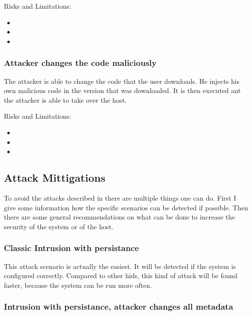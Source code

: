 \documentclass[
	a4paper,					%
	10pt,							%
	twoside,					%
	openright,				%
	notitlepage,			%
	parskip=half,			%
]{scrreprt}					%
\begin{document}
Risks and Limitations:
\begin{itemize}
	\item {}
	\item {}
	\item {}
\end{itemize}

\subsubsection{Attacker changes the code maliciously}
\label{sec:attack:codechange}

The attacker is able to change the code that the user downloads. He injects his own malicious code in the version that was downloaded. It is then executed ant the attacker is able to take over the host.

Risks and Limitations:
\begin{itemize}
	\item {}
	\item {}
	\item {}
\end{itemize}

\subsection{Attack Mittigations}
\label{sec:mittigations}

To avoid the attacks described in  there are multiple things one can do. First I give some information how the specific scenarios can be detected if possible. Then there are some general recommendations on what can be done to increase the security of the system or of the host.

\subsubsection{Classic Intrusion with persistance}
\label{sec:defense:classic}

This attack scenario is actually the easiest. It will be detected if the system is configured correctly. Compared to other \gls{hids}, this kind of attack will be found faster, because the system can be run more often. 

\subsubsection{Intrusion with persistance, attacker changes all metadata}
\label{sec:defense:changeattr}
\end{document}
